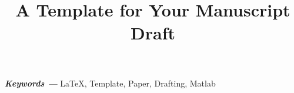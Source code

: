 \documentclass[11pt]{article}
\title{A Template for Your Manuscript Draft} %
\providecommand{\keywords}[1]
{
	\small	
	\textbf{\textit{Keywords --- }} #1
}
\begin{document}
	
	\maketitle
	
	
	
	\keywords{LaTeX, Template, Paper, Drafting, Matlab}
	
	
	
	

	

	

	\appendix
	
	
	
	\clearpage
	
	\listoffigures
	\listoftables
	\lstlistoflistings
	
	\newpage
	
	
	
\end{document}
